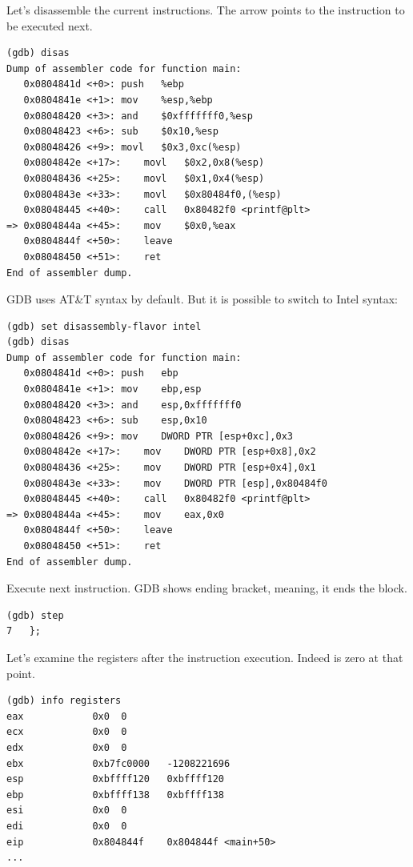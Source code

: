 Let's disassemble the current instructions.
The arrow points to the instruction to be executed next.

\begin{lstlisting}
(gdb) disas
Dump of assembler code for function main:
   0x0804841d <+0>:	push   %ebp
   0x0804841e <+1>:	mov    %esp,%ebp
   0x08048420 <+3>:	and    $0xfffffff0,%esp
   0x08048423 <+6>:	sub    $0x10,%esp
   0x08048426 <+9>:	movl   $0x3,0xc(%esp)
   0x0804842e <+17>:	movl   $0x2,0x8(%esp)
   0x08048436 <+25>:	movl   $0x1,0x4(%esp)
   0x0804843e <+33>:	movl   $0x80484f0,(%esp)
   0x08048445 <+40>:	call   0x80482f0 <printf@plt>
=> 0x0804844a <+45>:	mov    $0x0,%eax
   0x0804844f <+50>:	leave  
   0x08048450 <+51>:	ret    
End of assembler dump.
\end{lstlisting}

\ac{GDB} uses AT\&T syntax by default.
But it is possible to switch to Intel syntax:

\begin{lstlisting}
(gdb) set disassembly-flavor intel
(gdb) disas
Dump of assembler code for function main:
   0x0804841d <+0>:	push   ebp
   0x0804841e <+1>:	mov    ebp,esp
   0x08048420 <+3>:	and    esp,0xfffffff0
   0x08048423 <+6>:	sub    esp,0x10
   0x08048426 <+9>:	mov    DWORD PTR [esp+0xc],0x3
   0x0804842e <+17>:	mov    DWORD PTR [esp+0x8],0x2
   0x08048436 <+25>:	mov    DWORD PTR [esp+0x4],0x1
   0x0804843e <+33>:	mov    DWORD PTR [esp],0x80484f0
   0x08048445 <+40>:	call   0x80482f0 <printf@plt>
=> 0x0804844a <+45>:	mov    eax,0x0
   0x0804844f <+50>:	leave  
   0x08048450 <+51>:	ret    
End of assembler dump.
\end{lstlisting}

Execute next instruction.
\ac{GDB} shows ending bracket, meaning, it ends the block.

\begin{lstlisting}
(gdb) step
7	};
\end{lstlisting}

Let's examine the registers after the  instruction execution.
Indeed \EAX is zero at that point.

\begin{lstlisting}
(gdb) info registers
eax            0x0	0
ecx            0x0	0
edx            0x0	0
ebx            0xb7fc0000	-1208221696
esp            0xbffff120	0xbffff120
ebp            0xbffff138	0xbffff138
esi            0x0	0
edi            0x0	0
eip            0x804844f	0x804844f <main+50>
...
\end{lstlisting}

